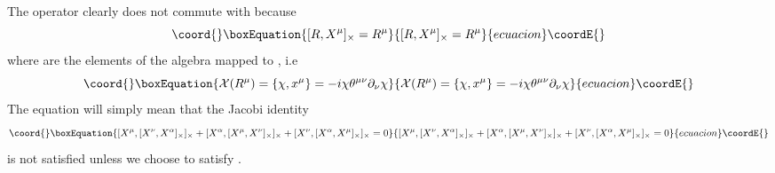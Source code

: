\documentclass[a4paper,12pt]{article}
\begin{document}
The operator \coordHE{} clearly does not commute with \coordHE{} because
\begin{equation}\coord{}\boxEquation{
[R,X^{\mu}]_{\times}=R^{\mu}
}{
[R,X^{\mu}]_{\times}=R^{\mu}
}{ecuacion}\coordE{}\end{equation}
where \coordHE{} are the elements of the algebra \coordHE{} mapped to \coordHE{} , i.e
\begin{equation}\coord{}\boxEquation{
{\cal X}(
R^{\mu})=\{{\chi},x^{\mu}\}=-i{\chi}{\theta}^{{\mu}{\nu}}{\partial}_{\nu}{\chi}
}{
{\cal X}(
R^{\mu})=\{{\chi},x^{\mu}\}=-i{\chi}{\theta}^{{\mu}{\nu}}{\partial}_{\nu}{\chi}
}{ecuacion}\coordE{}\end{equation}
The equation \coordHE{} will simply mean that the Jacobi identity
\begin{equation}\coord{}\boxEquation{
[X^{\mu},[X^{\nu},X^{\alpha}]_{\times}]_{\times}+[X^{\alpha},[X^{\mu},X^{\nu}]_{\times}]_{\times}+[X^{\nu},[X^{\alpha},X^{\mu}]_{\times}]_{\times}=0
}{
[X^{\mu},[X^{\nu},X^{\alpha}]_{\times}]_{\times}+[X^{\alpha},[X^{\mu},X^{\nu}]_{\times}]_{\times}+[X^{\nu},[X^{\alpha},X^{\mu}]_{\times}]_{\times}=0
}{ecuacion}\coordE{}\end{equation}
is not satisfied unless we choose \myHighlight{${\theta}$}\coordHE{} to satisfy \coordHE{} .
\end{document}
